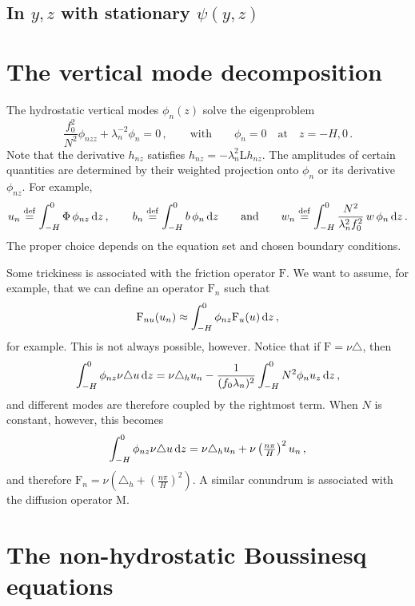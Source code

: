 \documentclass[12pt, oneside]{article}
\newcommand{\com}{\, ,}
\newcommand{\per}{\, .}
\newcommand{\defn}{\ensuremath{\stackrel{\mathrm{def}}{=}}}
\newcommand{\beq}{\begin{equation}}
\newcommand{\eeq}{\end{equation}}
\newcommand{\hlap}{\triangle_h}
\newcommand{\lap}{\triangle}
\newcommand{\id}{{\, \rm d}}
\renewcommand{\L}{\mathrm{L}}
\newcommand{\friction}{\mathrm{F}}
\newcommand{\mixing}{\mathrm{M}}
\newcommand{\mode}{\phi}
\begin{document}
\subsection{In $y, z$ with stationary $\psi(y, z)$}

\appendix

\section{The vertical mode decomposition}
\label{verticalModeProjection}

The hydrostatic vertical modes $\mode_n(z)$ solve the eigenproblem
\beq
\frac{f_0^2}{N^2} \mode_{nzz} + \lambda_n^{-2} \mode_n = 0 \com \qquad \text{with} \qquad \mode_n = 0 \quad \text{at} \quad z = -H, 0 \per
\label{modalEigenproblem}
\eeq
Note that the derivative $h_{nz}$ satisfies $h_{nz} = - \lambda_n^2 \L h_{nz}$.  The amplitudes of certain quantities are determined by their weighted projection onto $\mode_n$ or its derivative $\mode_{nz}$. For example, 
\beq
u_n \defn \int_{-H}^0 \Phi \, \mode_{nz} \id z \com \qquad b_n \defn \int_{-H}^0 b \, \mode_n \id z  \qquad \text{and} \qquad w_n \defn \int_{-H}^0 \frac{N^2}{\lambda_n^2 f_0^2} \, w \, \mode_n \id z  \per
\label{modezDef}
\eeq
The proper choice depends on the equation set and chosen boundary conditions.

Some trickiness is associated with the friction operator $\friction$. We want to assume, for example, that we can define an operator $\friction_n$ such that
\beq
\friction_{nu} (u_n) \approx \int_{-H}^0 \phi_{nz} \friction_u(u) \id z \com
\label{approximateFriction}
\eeq
for example. This is not always possible, however.  Notice that if $\friction = \nu \lap$, then
\beq
\int_{-H}^0 \phi_{nz} \nu \lap u \id z = \nu \hlap u_n - \frac{1}{(f_0 \lambda_n)^2} \int_{-H}^0 N^2 \phi_n u_{z} \id z \com
\eeq
and different modes are therefore coupled by the rightmost term. When $N$ is constant, however, this becomes 
\beq
\int_{-H}^0 \phi_{nz} \nu \lap u \id z = \nu \hlap u_n + \nu \left ( \tfrac{n \pi}{H} \right )^2 u_n \com
\eeq
and therefore $\friction_n = \nu \left ( \hlap + \left ( \tfrac{n \pi}{H} \right )^2 \right )$. A similar conundrum is associated with the diffusion operator $\mixing$.

\section{The non-hydrostatic Boussinesq equations}
\end{document}
